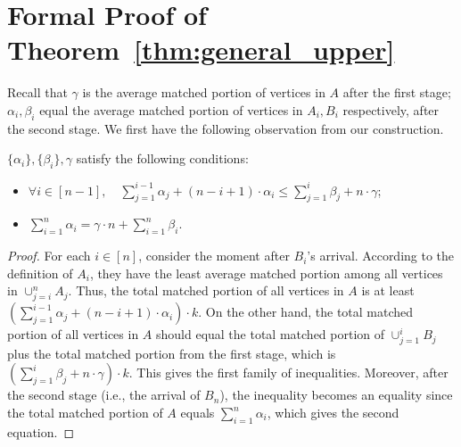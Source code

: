 \section{Formal Proof of Theorem~\ref{thm:general_upper}}
\label{app:general_upper}

Recall that $\gamma$ is the average matched portion of vertices in $A$ after the first stage; $\alpha_i, \beta_i$ equal the average matched portion of vertices in $A_i, B_i$ respectively, after the second stage. We first have the following observation from our construction.
\begin{lemma}
\label{lem:constraint}
$\{\alpha_i\},\{\beta_i\},\gamma$ satisfy the following conditions:
\begin{itemize}
\item $\forall i \in [n-1], \quad \sum_{j=1}^{i-1} \alpha_j + (n-i+1) \cdot \alpha_i \le \sum_{j=1}^{i} \beta_j + n \cdot \gamma$;
\item $\sum_{i=1}^{n} \alpha_i = \gamma \cdot n + \sum_{i=1}^{n} \beta_i$.
\end{itemize}
\end{lemma}
\begin{proof}
For each $i\in[n]$, consider the moment after $B_i$'s arrival. According to the definition of $A_i$, they have the least average matched portion among all vertices in $\cup_{j=i}^{n} A_j$. Thus, the total matched portion of all vertices in $A$ is at least $\left( \sum_{j=1}^{i-1}\alpha_j + (n-i+1) \cdot \alpha_i \right) \cdot k$. On the other hand, the total matched portion of all vertices in $A$ should equal the total matched portion of $\cup_{j=1}^{i} B_j$ plus the total matched portion from the first stage, which is $\left(\sum_{j=1}^{i} \beta_j + n \cdot \gamma \right)\cdot k$. This gives the first family of inequalities.
Moreover, after the second stage (i.e., the arrival of $B_n$), the inequality becomes an equality since the total matched portion of $A$ equals $\sum_{i=1}^{n} \alpha_i$, which gives the second equation.
\end{proof}

